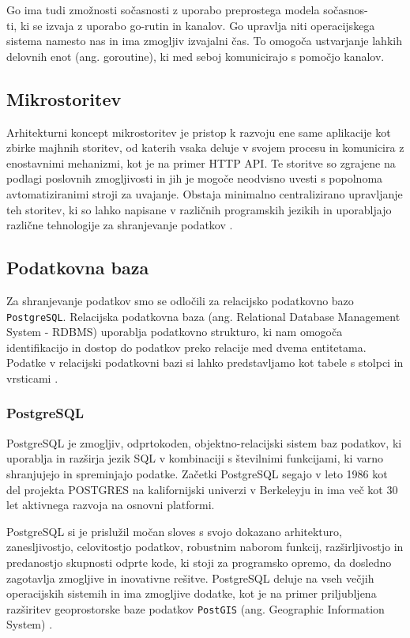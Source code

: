 Go ima tudi zmožnosti sočasnosti z uporabo preprostega modela sočasnos-\\ti, ki se izvaja z uporabo go-rutin in kanalov. Go upravlja niti operacijskega sistema namesto nas in ima zmogljiv izvajalni čas. To omogoča ustvarjanje lahkih delovnih enot (ang. goroutine), ki med seboj komunicirajo s pomočjo kanalov.

\subsection{Mikrostoritev}
Arhitekturni koncept mikrostoritev je pristop k razvoju ene same aplikacije kot zbirke majhnih storitev, od katerih vsaka deluje v svojem procesu in komunicira z enostavnimi mehanizmi, kot je na primer HTTP API. Te storitve so zgrajene na podlagi poslovnih zmogljivosti in jih je mogoče neodvisno uvesti s popolnoma avtomatiziranimi stroji za uvajanje. Obstaja minimalno centralizirano upravljanje teh storitev, ki so lahko napisane v različnih programskih jezikih in uporabljajo različne tehnologije za shranjevanje podatkov \cite{mfowler-microservices}.


\subsection{Podatkovna baza}
Za shranjevanje podatkov smo se odločili za relacijsko podatkovno bazo \verb=PostgreSQL=. Relacijska podatkovna baza (ang. Relational Database Management System - RDBMS) uporablja podatkovno strukturo, ki nam omogoča identifikacijo in dostop do podatkov preko relacije med dvema entitetama. Podatke v relacijski podatkovni bazi si lahko predstavljamo kot tabele s stolpci in vrsticami \cite{oracle-rdbms}.


\subsubsection{PostgreSQL}
PostgreSQL je zmogljiv, odprtokoden, objektno-relacijski sistem baz podatkov, ki uporablja in razširja jezik SQL v kombinaciji s številnimi funkcijami, ki varno shranjujejo in spreminjajo podatke. Začetki PostgreSQL segajo v leto 1986 kot del projekta POSTGRES na kalifornijski univerzi v Berkeleyju in ima več kot 30 let aktivnega razvoja na osnovni platformi.

PostgreSQL si je prislužil močan sloves s svojo dokazano arhitekturo, zanesljivostjo, celovitostjo podatkov, robustnim naborom funkcij, razširljivostjo in predanostjo skupnosti odprte kode, ki stoji za programsko opremo, da dosledno zagotavlja zmogljive in inovativne rešitve.
PostgreSQL deluje na vseh večjih operacijskih sistemih in ima zmogljive dodatke, kot je na primer priljubljena razširitev geoprostorske baze podatkov \verb=PostGIS= (ang. Geographic Information System) \cite{pg-database-postgis}.



